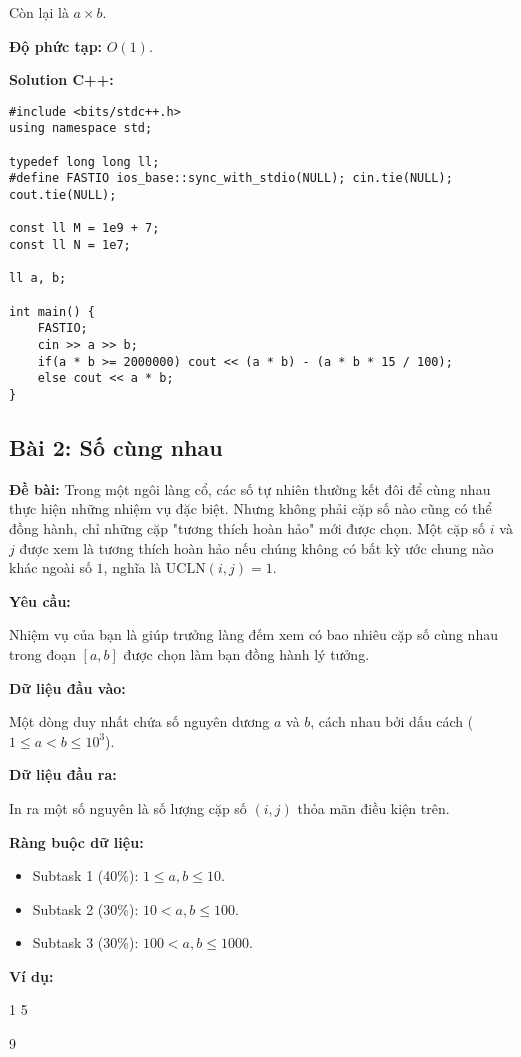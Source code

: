 \documentclass[12pt]{scrartcl}  %
\begin{document}
Còn lại là $a \times b$.

\textbf{Độ phức tạp:} $O(1)$.

\textbf{Solution C++:}
\begin{lstlisting}
#include <bits/stdc++.h>
using namespace std;

typedef long long ll;
#define FASTIO ios_base::sync_with_stdio(NULL); cin.tie(NULL); cout.tie(NULL);

const ll M = 1e9 + 7;
const ll N = 1e7;

ll a, b;

int main() {
    FASTIO;
    cin >> a >> b;
    if(a * b >= 2000000) cout << (a * b) - (a * b * 15 / 100);
    else cout << a * b;
}
\end{lstlisting}

\subsection{Bài 2: Số cùng nhau}
\textbf{Đề bài:}
Trong một ngôi làng cổ, các số tự nhiên thường kết đôi để cùng nhau thực hiện những nhiệm vụ đặc biệt. Nhưng không phải cặp số nào cũng có thể đồng hành, chỉ những cặp "tương thích hoàn hảo" mới được chọn. Một cặp số $i$ và $j$ được xem là tương thích hoàn hảo nếu chúng không có bất kỳ ước chung nào khác ngoài số $1$, nghĩa là $\mathrm{UCLN}(i, j) = 1$.

\textbf{Yêu cầu:}

Nhiệm vụ của bạn là giúp trưởng làng đếm xem có bao nhiêu cặp số cùng nhau trong đoạn $[a, b]$ được chọn làm bạn đồng hành lý tưởng.

\textbf{Dữ liệu đầu vào:}

Một dòng duy nhất chứa số nguyên dương $a$ và $b$, cách nhau bởi dấu cách ($1 \leq a < b \leq 10^3$).

\textbf{Dữ liệu đầu ra:}

In ra một số nguyên là số lượng cặp số $(i, j)$ thỏa mãn điều kiện trên.

\textbf{Ràng buộc dữ liệu:}

\begin{itemize}
    \item Subtask 1 (40\%): $1 \leq a, b \leq 10$.
    \item Subtask 2 (30\%): $10 < a, b \leq 100$.
    \item Subtask 3 (30\%): $100 < a, b \leq 1000$.
\end{itemize}

\textbf{Ví dụ:}
\begin{tcolorbox}[colback=gray!5!white, colframe=blue!50!black, title=Input]
1 5
\end{tcolorbox}
\begin{tcolorbox}[colback=gray!5!white, colframe=green!50!black, title=Output]
9
\end{tcolorbox}
\end{document}

